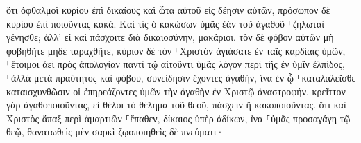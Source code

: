 \documentclass{openreader}
\begin{document}
ὅτι ὀφθαλμοὶ κυρίου ἐπὶ δικαίους καὶ ὦτα αὐτοῦ εἰς δέησιν αὐτῶν, πρόσωπον δὲ κυρίου ἐπὶ ποιοῦντας κακά. 
Καὶ τίς ὁ κακώσων ὑμᾶς ἐὰν τοῦ ἀγαθοῦ ⸀ζηλωταὶ γένησθε; 
ἀλλ’ εἰ καὶ πάσχοιτε διὰ δικαιοσύνην, μακάριοι. τὸν δὲ φόβον αὐτῶν μὴ φοβηθῆτε μηδὲ ταραχθῆτε, 
κύριον δὲ τὸν ⸀Χριστὸν ἁγιάσατε ἐν ταῖς καρδίαις ὑμῶν, ⸀ἕτοιμοι ἀεὶ πρὸς ἀπολογίαν παντὶ τῷ αἰτοῦντι ὑμᾶς λόγον περὶ τῆς ἐν ὑμῖν ἐλπίδος, 
⸀ἀλλὰ μετὰ πραΰτητος καὶ φόβου, συνείδησιν ἔχοντες ἀγαθήν, ἵνα ἐν ᾧ ⸀καταλαλεῖσθε καταισχυνθῶσιν οἱ ἐπηρεάζοντες ὑμῶν τὴν ἀγαθὴν ἐν Χριστῷ ἀναστροφήν. 
κρεῖττον γὰρ ἀγαθοποιοῦντας, εἰ θέλοι τὸ θέλημα τοῦ θεοῦ, πάσχειν ἢ κακοποιοῦντας. 
ὅτι καὶ Χριστὸς ἅπαξ περὶ ἁμαρτιῶν ⸀ἔπαθεν, δίκαιος ὑπὲρ ἀδίκων, ἵνα ⸀ὑμᾶς προσαγάγῃ τῷ θεῷ, θανατωθεὶς μὲν σαρκὶ ζῳοποιηθεὶς δὲ πνεύματι· 
\end{document}
